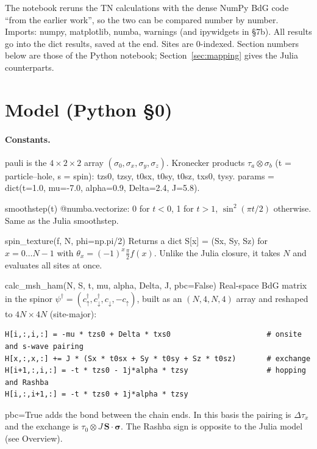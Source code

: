 \documentclass[11pt]{article}
\newcommand{\codeus}{\textunderscore\allowbreak}
\renewcommand{\code}[1]{{\ttfamily\let\_\codeus #1}}
\begin{document}
The notebook reruns the TN calculations with the dense NumPy BdG code ``from the earlier work'', so the two can be compared number by number. Imports: \code{numpy}, \code{matplotlib}, \code{numba}, \code{warnings} (and \code{ipywidgets} in §7b). All results go into the dict \code{results}, saved at the end. Sites are 0-indexed. Section numbers below are those of the Python notebook; Section~\ref{sec:mapping} gives the Julia counterparts.

\section{Model (Python §0)}

\paragraph{Constants.} \code{pauli} is the $4\times2\times2$ array $(\sigma_0,\sigma_x,\sigma_y,\sigma_z)$. Kronecker products $\tau_a\otimes\sigma_b$ (\code{t} = particle–hole, \code{s} = spin): \code{tzs0}, \code{tzsy}, \code{t0sx}, \code{t0sy}, \code{t0sz}, \code{txs0}, \code{tysy}. \code{params = dict(t=1.0, mu=-7.0, alpha=0.9, Delta=2.4, J=5.8)}.

\begin{function}{smoothstep(t)}
\code{@numba.vectorize}: 0 for $t<0$, 1 for $t>1$, $\sin^2(\pi t/2)$ otherwise. Same as the Julia \code{smoothstep}.
\end{function}

\begin{function}{spin\_texture(f, N, phi=np.pi/2)}
Returns a dict \code{S[x] = (Sx, Sy, Sz)} for $x=0\dots N-1$ with $\theta_x=(-1)^x\frac\pi2 f(x)$. Unlike the Julia closure, it takes $N$ and evaluates all sites at once.
\end{function}

\begin{function}{calc\_msh\_ham(N, S, t, mu, alpha, Delta, J, pbc=False)}
Real-space BdG matrix in the spinor $\psi^\dagger=(c^\dagger_\uparrow,c^\dagger_\downarrow,c_\downarrow,-c_\uparrow)$, built as an $(N,4,N,4)$ array and reshaped to $4N\times4N$ (site-major):
\begin{Verbatim}
H[i,:,i,:] = -mu * tzs0 + Delta * txs0                      # onsite and s-wave pairing
H[x,:,x,:] += J * (Sx * t0sx + Sy * t0sy + Sz * t0sz)       # exchange
H[i+1,:,i,:] = -t * tzs0 - 1j*alpha * tzsy                  # hopping and Rashba
H[i,:,i+1,:] = -t * tzs0 + 1j*alpha * tzsy
\end{Verbatim}
\code{pbc=True} adds the bond between the chain ends. In this basis the pairing is $\Delta\tau_x$ and the exchange is $\tau_0\otimes J\,\mathbf S\cdot\boldsymbol\sigma$. The Rashba sign is opposite to the Julia model (see Overview).
\end{function}
\end{document}
